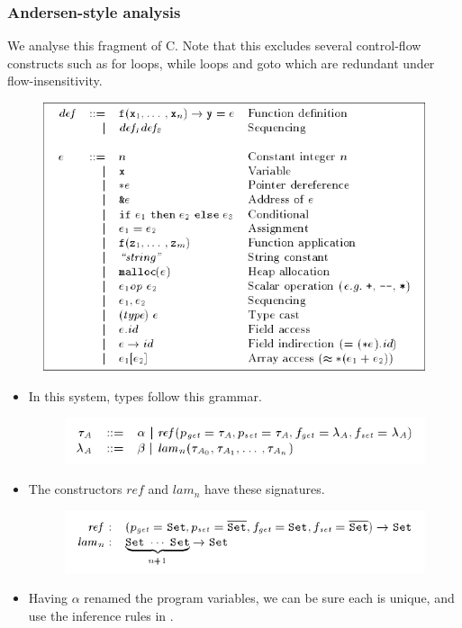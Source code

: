 \documentclass{beamer}
\begin{document}
\begin{frame}[allowframebreaks]
  \frametitle{Andersen-style analysis}
  We analyse this fragment of C. Note that this excludes several
  control-flow constructs such as for loops, while loops and goto
  which are redundant under flow-insensitivity.

  \begin{figure}
    \centering
    \includegraphics[scale=0.3]{language_syntax.png}
  \end{figure}

  \framebreak

  \begin{itemize}
  \item In this system, types follow this grammar.
    \begin{figure}
      \centering
      \includegraphics[scale=0.3]{andersen_type_grammar.png}
    \end{figure}
  \item The constructors $ref$ and $lam_n$ have these signatures.
    \begin{figure}
      \centering
      \includegraphics[scale=0.3]{andersen_constructor_signatures.png}
    \end{figure}
  \item Having $\alpha$ renamed the program variables, we can be sure
    each is unique, and use the inference rules in .
  \end{itemize}


\end{frame}
\end{document}
